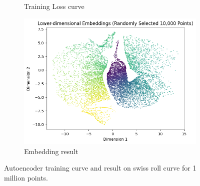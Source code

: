 \begin{itemize}
\begin{itemize}
\begin{figure}[H]
\begin{subfigure}{0.45\textwidth}
	      		\caption{Training Loss curve}
	      		\label{fig:autoencoder-training-1M}
	      	\end{subfigure}
	      	\begin{subfigure}{0.45\textwidth}
	      		\includegraphics[width=\linewidth]{images/autoencoder_result_1M.png}
	      		\caption{Embedding result}
	      		\label{fig:autoencoder-result-1M}
	      	\end{subfigure}
	      	\label{fig:autoencoder-1M}
	      	\caption{Autoencoder training curve and result on swiss roll curve for 1 million points.}
	      \end{figure}


\end{itemize}
\end{itemize}
